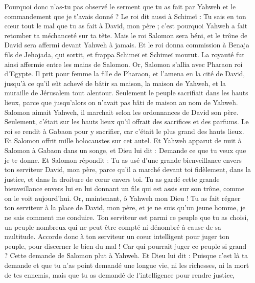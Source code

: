 \begin{multicols}{2}
Pourquoi donc n'as-tu pas observé le serment que tu as fait par Yahweh et le commandement que je t'avais donné ?
Le roi dit aussi à Schimeï : Tu sais en ton cœur tout le mal que tu as fait à David, mon père ; c'est pourquoi Yahweh a fait retomber ta méchanceté sur ta tête.
Mais le roi Salomon sera béni, et le trône de David sera affermi devant Yahweh à jamais.
Et le roi donna commission à Benaja fils de Jehojada, qui sortit, et frappa Schimeï et Schimeï mourut. La royauté fut ainsi affermie entre les mains de Salomon.
\VerseOne{}Or, Salomon s'allia avec Pharaon roi d'Egypte. Il prit pour femme la fille de Pharaon, et l'amena en la cité de David, jusqu'à ce qu'il eût achevé de bâtir sa maison, la maison de Yahweh, et la muraille de Jérusalem tout alentour.
Seulement le peuple sacrifiait dans les hauts lieux, parce que jusqu’alors on n’avait pas bâti de maison au nom de Yahweh.
Salomon aimait Yahweh, il marchait selon les ordonnances de David son père. Seulement, c’était sur les hauts lieux qu’il offrait des sacrifices et des parfums.
Le roi se rendit à Gabaon pour y sacrifier, car c'était le plus grand des hauts lieux. Et Salomon offrit mille holocaustes sur cet autel.
Et Yahweh apparut de nuit à Salomon à Gabaon dans un songe, et Dieu lui dit : Demande ce que tu veux que je te donne.
Et Salomon répondit : Tu as usé d'une grande bienveillance envers ton serviteur David, mon père, parce qu’il a marché devant toi fidèlement, dans la justice, et dans la droiture de cœur envers toi. Tu as gardé cette grande bienveillance envers lui en lui donnant un fils qui est assis sur son trône, comme on le voit aujourd'hui.
Or, maintenant, ô Yahweh mon Dieu ! Tu as fait régner ton serviteur à la place de David, mon père, et je ne suis qu'un jeune homme, je ne sais comment me conduire.
Ton serviteur est parmi ce peuple que tu as choisi, un peuple nombreux qui ne peut être compté ni dénombré à cause de sa multitude.
Accorde donc à ton serviteur un cœur intelligent pour juger ton peuple, pour discerner le bien du mal ! Car qui pourrait juger ce peuple si grand ?
Cette demande de Salomon plut à Yahweh.
Et Dieu lui dit : Puisque c’est là ta demande et que tu n'as point demandé une longue vie, ni les richesses, ni la mort de tes ennemis, mais que tu as demandé de l'intelligence pour rendre justice,

\end{multicols}
